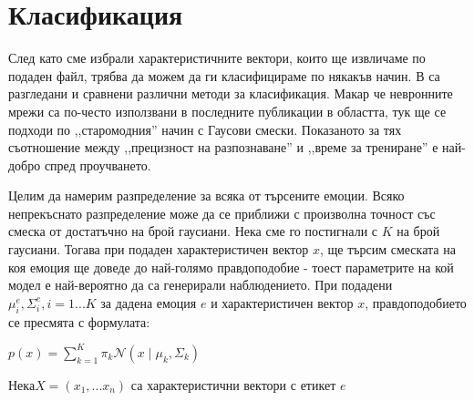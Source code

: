\documentclass[main.tex]{subfiles}
\begin{document}
\section{Класификация}

След като сме избрали характеристичните вектори, които ще извличаме по подаден файл, трябва да можем да ги класифицираме по някакъв начин.
В \cite{survey} са разгледани и сравнени различни методи за класификация. Макар че невронните мрежи са по-често използвани в последните публикации в областта,
тук ще се подходи по ,,старомодния'' начин с Гаусови смески. Показаното за тях съотношение между ,,прецизност на разпознаване'' и ,,време за трениране'' е най-добро спред проучването.

Целим да намерим разпределение за всяка от търсените емоции. Всяко непрекъснато разпределение може да се приближи с произволна точност със смеска от достатъчно на брой гаусиани. Нека сме го постигнали с $K$ на брой гаусиани. Тогава при подаден характеристичен вектор $x$, ще търсим смеската на коя емоция ще доведе до най-голямо правдоподобие - тоест параметрите на кой модел е най-вероятно да са генерирали наблюдението. При подадени $\mu_i^e, \Sigma_i^e, i=1...K$ за дадена емоция $e$ и характеристичен вектор $x$, правдоподобието се пресмята с формулата:

$p(x) = \sum\limits_{k=1}^{K} \pi_k \mathcal{N}(x\mid \mu_k, \Sigma_k)$


Нека$X=(x_1,...x_n)$ са характеристични вектори с етикет $e$ 
\end{document}
